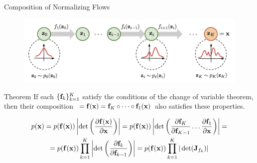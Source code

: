 \documentclass{beamer}
\begin{document}
\begin{frame}{Composition of Normalizing Flows}
	\vspace{-0.3cm}
	\begin{figure}
		\includegraphics[width=0.95\linewidth]{figs/normalizing-flow}
	\end{figure}
	\vspace{-0.3cm}
	\begin{block}{Theorem}
		If each $\{\mathbf{f}_k\}_{k=1}^K$ satisfy the conditions of the change of variable theorem, then their composition $\ = \mathbf{f}(\mathbf{x}) = \mathbf{f}_K \circ \dots \circ \mathbf{f}_1(\mathbf{x})$ also satisfies these properties.
	\end{block}
	\vspace{-0.3cm}
	{ \footnotesize
		\begin{multline*}
			p(\mathbf{x}) = p(\mathbf{f}(\mathbf{x})) \left|\det \left(\frac{\partial \mathbf{f}(\mathbf{x})}{\partial \mathbf{x}} \right) \right| =
			p(\mathbf{f}(\mathbf{x})) \left|\det \left(\frac{\partial \mathbf{f}_K}{\partial \mathbf{f}_{K-1}} \dots \frac{\partial \mathbf{f}_1}{\partial \mathbf{x}} \right) \right| = \\ = p(\mathbf{f}(\mathbf{x})) \prod_{k=1}^K \left|\det \left(\frac{\partial \mathbf{f}_{k}}{\partial \mathbf{f}_{k-1}} \right) \right|
			= p(\mathbf{f}(\mathbf{x})) \prod_{k=1}^K |\det ( \mathbf{J}_{f_k}) |
		\end{multline*}
	}
\end{frame}
\end{document}

